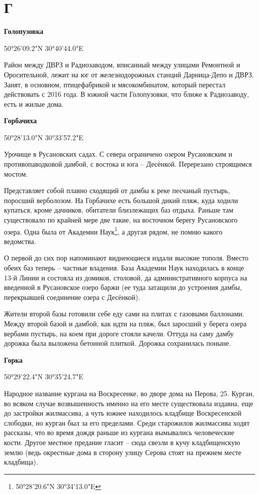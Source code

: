 \chapter*{Г}

\textbf{Голопузовка}

50°26'09.2"N 30°40'44.0"E

Район между ДВРЗ и Радиозаводом, вписанный между улицами Ремонтной и Оросительной, лежит на юг от железнодорожных станций Дарница-Депо и ДВРЗ. Занят, в основном, птицефабрикой и мясокомбинатом, который перестал действовать с 2016 года. В южной части Голопузовки, что ближе к Радиозаводу, есть и жилые дома.\\

\medskip

\textbf{Горбачиха}

50°28'13.0"N 30°33'57.2"E

Урочище в Русановских садах. С севера ограничено озером Русановским и противопаводковой дамбой, с востока и юга – Десёнкой. Перерезано строящимся мостом.

Представляет собой плавно сходящий от дамбы к реке песчаный пустырь, поросший верболозом. На Горбачихе есть большой дикий пляж, куда ходили  купаться, кроме дачников, обитатели близлежащих баз отдыха. Раньше там существовало по крайней мере две такие, на восточном берегу Русановского озера. Одна была от Академии Наук\footnote{50°28'20.6"N 30°34'13.0"E}, а другая рядом, не помню какого ведомства. 

О первой до сих пор напоминают виднеющиеся издали высокие тополя. Вместо обеих баз теперь – частные владения. База Академии Наук находилась в конце 13-й Линии и состояла из домиков, столовой, да административного корпуса на введенной в Русановское озеро баржи (ее туда затащили до устроения дамбы, перекрывшей соединение озера с Десёнкой).

Жители второй базы готовили себе еду сами на плитах с газовыми баллонами. Между второй базой и дамбой, как идти на пляж, был заросший у берега озера вербами пустырь, на коем при дороге стояли качели. Оттуда на саму дамбу дорожка была выложена бетонной плиткой. Дорожка сохранилась поныне.\\

\medskip


\textbf{Горка}

50°29'22.4"N 30°35'24.7"E

Народное название кургана на Воскресенке, во дворе дома на Перова, 25. Курган, во всяком случае возвышенность именно на его месте существовала издавна, еще до застройки жилмассива, а чуть южнее находилось кладбище Воскресенской слободки, но курган был за его пределами. Среди старожилов жилмассива ходят рассказы, что во время дождя раньше из кургана вымывались человеческие кости. Другое местное предание гласит – сюда свезли в кучу кладбищенскую землю (ведь окрестные дома в сторону улицу Серова стоят на прежнем месте кладбища).\\

